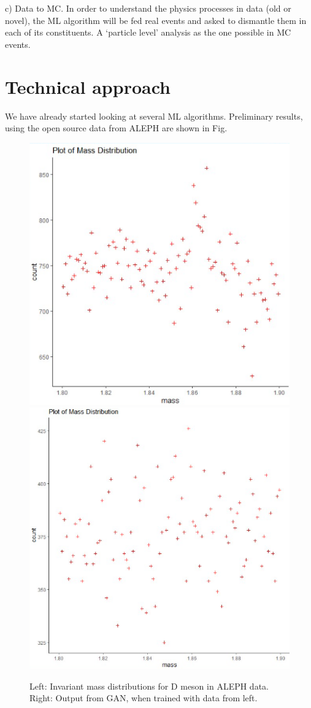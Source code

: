 c) Data to MC. In order to understand the physics processes in data (old or novel), the ML algorithm will be fed real events and asked to dismantle them in each of its constituents. A `particle level' analysis as the one possible in MC events. 

\section{Technical approach}
We have already started looking at several ML algorithms. Preliminary results, using the open source data from ALEPH are shown in Fig.~


\begin{figure}[!ht]
\begin{center}
\includegraphics[width=.4\textwidth]{figures/Fig1_massDFromDataAleph}
\includegraphics[width=.4\textwidth]{figures/Fig1_massDFromGAN100kEntry}
\caption{Left: Invariant mass distributions for D meson in \eecol ALEPH data. Right: Output from GAN, when trained with data from left. }
\label{fig:concept}
\end{center}
\end{figure}

\clearpage


